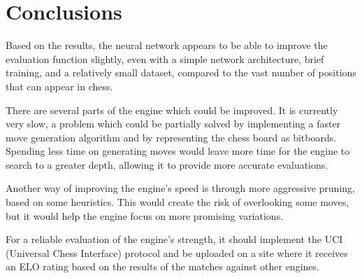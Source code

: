 \chapter{Conclusions}
\label{conclusions}


Based on the results, the neural network appears to be able to improve the evaluation function slightly, even with a simple network architecture, brief training, and a relatively small dataset, compared to the vast number of positions that can appear in chess.

There are several parts of the engine which could be improved. It is currently very slow, a problem which could be partially solved by implementing a faster move generation algorithm and by representing the chess board as bitboards. Spending less time on generating moves would leave more time for the engine to search to a greater depth, allowing it to provide more accurate evaluations.

Another way of improving the engine's speed is through more aggressive pruning, based on some heuristics. This would create the risk of overlooking some moves, but it would help the engine focus on more promising variations.

For a reliable evaluation of the engine's strength, it should implement the UCI (Universal Chess Interface) protocol \cite{uci-protocol} and be uploaded on a site where it receives an ELO rating based on the results of the matches against other engines.